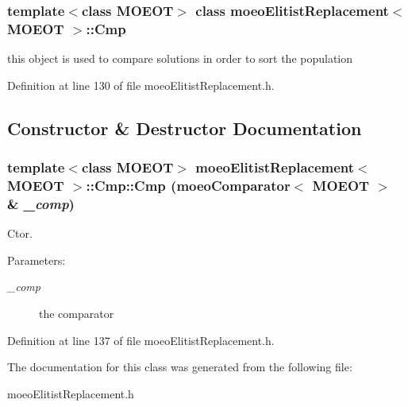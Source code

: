 \subsubsection*{template$<$class MOEOT$>$ class moeo\-Elitist\-Replacement$<$ MOEOT $>$::Cmp}

this object is used to compare solutions in order to sort the population 



Definition at line 130 of file moeo\-Elitist\-Replacement.h.

\subsection{Constructor \& Destructor Documentation}
\subsubsection{\setlength{\rightskip}{0pt plus 5cm}template$<$class MOEOT$>$ \bf{moeo\-Elitist\-Replacement}$<$ MOEOT $>$::Cmp::Cmp (\bf{moeo\-Comparator}$<$ MOEOT $>$ \& {\em \_\-comp})\hspace{0.3cm}{\tt  [inline]}}\label{classmoeoElitistReplacement_1_1Cmp_c9f21fe0df172dc601a13d6531c5ffd9}


Ctor. 

\begin{Desc}
\item[Parameters:]
\begin{description}
\item[{\em \_\-comp}]the comparator \end{description}
\end{Desc}


Definition at line 137 of file moeo\-Elitist\-Replacement.h.

The documentation for this class was generated from the following file:\begin{CompactItemize}
\item 
moeo\-Elitist\-Replacement.h\end{CompactItemize}
